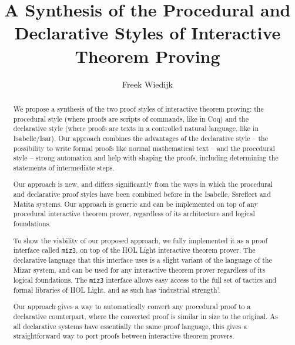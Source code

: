 \documentclass{LMCS}
\begin{document}
\title[A Synthesis of the Procedural and Declarative Styles of Interactive \dots]
{A Synthesis of the Procedural and Declarative Styles of
Interactive Theorem Proving}
\author[F.~Wiedijk]{Freek Wiedijk}
\address{
Institute for Computing and Information Sciences,
Radboud University Nijmegen,
Heyendaalse\-weg~135, 6525 AJ Nijmegen, The Netherlands}

\begin{abstract}
We propose a synthesis of the two proof styles of interactive
theorem proving: the procedural style (where proofs are
scripts of commands, like in Coq) and the declarative style
(where proofs are texts in a controlled natural language,
like in Isabelle/Isar).  Our approach combines the advantages
of the declarative style -- the possibility to write formal
proofs like normal mathematical text -- and the procedural
style -- strong automation and help with shaping the proofs,
including determining the statements of intermediate steps.

Our approach is new, and differs significantly from the ways
in which the procedural and declarative proof styles have
been combined before in the Isabelle, Ssreflect and Matita systems.
Our approach is generic and can be implemented on top of
any procedural interactive theorem prover, regardless of
its architecture and logical foundations.

To show the viability of our proposed approach, we fully
implemented it as a proof interface called \texttt{miz3}, on top of
the HOL Light interactive theorem prover.  The declarative
language that this interface uses is a slight variant
of the language of the Mizar system, and can be used for
any interactive theorem prover regardless of its logical
foundations.  The \texttt{miz3} interface allows easy access to
the full set of tactics and formal libraries of HOL Light,
and as such has `industrial strength'.

Our approach gives a way to automatically convert any
procedural proof to a declarative counterpart, where
the converted proof is similar in size to the original.
As all declarative systems have essentially the same proof
language, this gives a straightforward way to port proofs
between interactive theorem provers.
\end{abstract}
\end{document}
